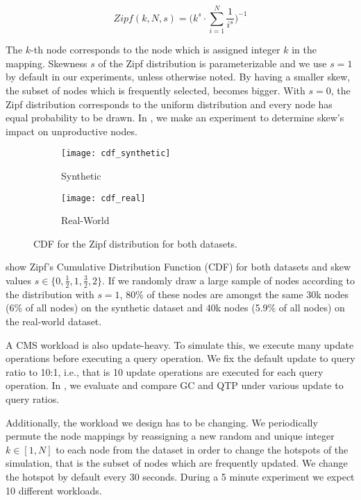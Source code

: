 \documentclass[abstracton,12pt]{scrartcl}
\theoremstyle{definition}
\begin{document}
\begin{large}

    $$ Zipf(k,N,s) = \bigg(k^s \cdot \sum_{i=1}^{N}\frac{1}{i^s} \bigg)^{-1} $$

\end{large}

The $k$-th node corresponds to the node which is assigned integer $k$ in the mapping.
Skewness $s$ of the Zipf distribution is parameterizable and we use $s=1$ by
default in our experiments, unless otherwise noted. By having a smaller skew,
the subset of nodes which is frequently selected, becomes bigger.
With $s=0$, the Zipf distribution corresponds to the uniform distribution
and every node has equal probability to be drawn.
In , we make an experiment to determine skew's impact on
unproductive nodes.

\begin{figure}[h]
  \centering
   \begin{subfigure}{0.49\linewidth}
    \centering
    \caption{Synthetic}
    \texttt{[image: cdf\_synthetic]}
    \label{fig:cdf_synthetic}
  \end{subfigure}
  \begin{subfigure}{0.49\linewidth}
    \centering
    \caption{Real-World}
    \texttt{[image: cdf\_real]}
    \label{fig:cdf_real}
  \end{subfigure}
  \vspace{-0.5cm}
  \caption{CDF for the Zipf distribution for both datasets.}
\end{figure}

 show Zipf's Cumulative Distribution
Function (CDF) for both datasets and skew values $s \in \{0, \frac{1}{2}, 1, \frac{3}{2}, 2\}$.
If we randomly draw a large sample of nodes according to the distribution with $s=1$,
80\% of these nodes are amongst the same 30k nodes (6\% of all nodes) on the synthetic
dataset and 40k nodes (5.9\% of all nodes) on the real-world dataset.

A CMS workload is also update-heavy. To simulate this, we execute many update 
operations before
executing a query operation. We fix the default update to query ratio to 10:1, i.e., 
that is 10 update operations are executed for each query operation. In
, we evaluate and compare GC and QTP under various
update to query ratios.

Additionally, the workload we design has to be changing. We periodically permute 
the node mappings by reassigning a new random and unique integer $k \in [1,N]$ to each
node from the dataset in order to change the hotspots of the simulation, that is
the subset of nodes which are frequently updated.
We change the hotspot by default every 30 seconds. During a 5 minute
experiment we expect 10 different workloads.
\end{document}
